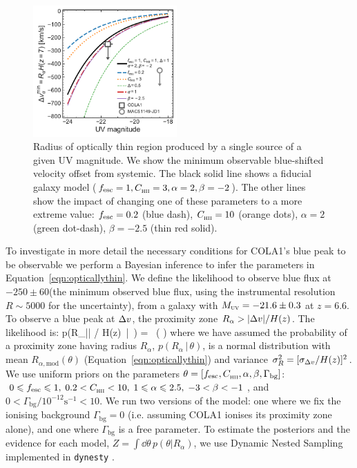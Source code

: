 \documentclass[fleqn,usenatbib]{mnras}
\begin{document}
\begin{figure}
    \includegraphics[width=0.49\textwidth]{figs/fig6.pdf}
    \caption{Radius of optically thin region produced by a single source of a given UV magnitude. We show the minimum observable blue-shifted velocity offset from systemic. The black solid line shows a fiducial galaxy model ($\fesc=1, \clump=3, \alpha=2, \beta=-2$). The other lines show the impact of changing one of these parameters to a more extreme value: $\fesc=0.2$ (blue dash), $\clump=10$ (orange dots), $\alpha=2$ (green dot-dash), $\beta=-2.5$ (thin red solid).}
    \label{fig:R_opticallythin}
\end{figure}

To investigate in more detail the necessary conditions for COLA1's blue peak to be observable we perform a Bayesian inference to infer the parameters in Equation~\eqref{eqn:opticallythin}. We define the likelihood to observe blue \lya flux at $-250\pm60$\kms (the minimum observed blue flux, using the instrumental resolution $R\sim5000$ for the uncertainty), from a galaxy with $\MUV = -21.6\pm0.3$ at $z=6.6$. To observe a blue peak at $\DV$, the proximity zone $R_\alpha > |\DV| / H(z)$. The likelihood is:
%
\BE \label{eqn:like}
p(R_\alpha \geq |\DV| / H(z) \,|\, \theta) =  \, \left( \right)
\EE
%
where we have assumed the probability of a proximity zone having radius $R_\alpha$, $p(R_\alpha \,|\, \theta)$, is a normal distribution with mean $R_{\alpha,\mathrm{mod}}(\theta)$ (Equation~\ref{eqn:opticallythin}) and variance $\sigma_R^2 = [\sigma_{\DV}/H(z)]^2$. We use uniform priors on the parameters $\theta = [\fesc, \clump, \alpha, \beta, \Gamma_\mathrm{bg}]$: $0 \leq \fesc \leq 1, \; 0.2 < \clump < 10, \; 1 \leq \alpha \leq 2.5, \;-3 < \beta < -1$, and $0 < \Gamma_\mathrm{bg}/10^{-12}\mathrm{s}^{-1} < 10$. We run two versions of the model: one where we fix the ionising background $\Gamma_\mathrm{bg} = 0$ (i.e. assuming COLA1 ionises its proximity zone alone), and one where $\Gamma_\mathrm{bg}$ is a free parameter. To estimate the posteriors and the evidence for each model, $Z = \int \dd \theta \, p(\theta | R_\alpha)$, we use Dynamic Nested Sampling implemented in \verb|dynesty| \citep{Speagle2019}.
\end{document}
